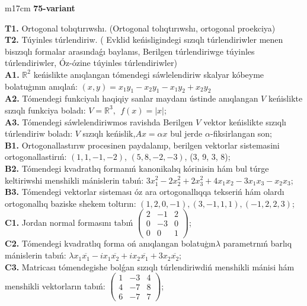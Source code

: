 \documentclass{article}
\begin{document}
\vspace{1cm}


\begin{tabular}{m{17cm}}
\textbf{75-variant}
\newline

\textbf{T1.} Ortogonal  tolıqtırıwshı. (Ortogonal tolıqtırıwshı,  ortogonal proekciya) \\
\textbf{T2.} Túyinles túrlendiriw. ( Evklid keńisligindegi sızıqlı túrlendiriwler menen bisızıqlı formalar arasındaǵı baylanıs, Berilgen túrlendiriwge túyinles túrlendiriwler, Óz-ózine túyinles túrlendiriwler) \\
\textbf{A1.} \(\mathbb{R}^{2}\) keńislikte anıqlangan tómendegi sáwlelendiriw skalyar kóbeyme bolatuģının anıqlań: \((x,y) = x_{1}y_{1} - x_{2}y_{1} - x_{1}y_{2} + x_{2}y_{2}\) \\
\textbf{A2.} Tómendegi funkciyalı haqiqiy sanlar maydanı ústinde anıqlangan \(V\) keńislikte sızıqlı funkciya boladı: \(V = \mathbb{R}^{3},\ \ f(x) = |x|\); \\
\textbf{A3.} Tómendegi sáwlelendiriwmos ravishda Berilgen \(V\) vektor keńislikte sızıqlı túrlendiriw boladı: \(V\) sızıqlı keńislik,\(Ax = \alpha x\) bul jerde \(\alpha\)-fiksirlangan son; \\
\textbf{B1.} Ortogonallastırıw procesinen paydalanıp, berilgen vektorlar sistemasini ortogonallastirıń: \((1,1, - 1, - 2)\), \((5,8, - 2, - 3)\), (3, 9, 3, 8); \\
\textbf{B2.} Tómendegi kvadratlıq formanıń kanonikalıq kórinisin hám bul túrge keltiriwshi menshikli mánislerin tabıń: \(3x_{1}^{2} - 2x_{2}^{2} + 2x_{3}^{2} + 4x_{1}x_{2} - 3x_{1}x_{3} - x_{2}x_{3}\); \\
\textbf{B3.} Tómendegi vektorlar sisteması óz ara ortogonallıqqa tekseriń hám olardı ortogonallıq baziske shekem toltırın: \((1,2,0, - 1),(3, - 1,1,1),( - 1,2,2,3)\); \\
\textbf{C1.} Jordan normal formasını tabıń \(\begin{pmatrix} 2 & - 1 & 2 \\ 0 & - 3 & 0 \\ 0 & 0 & 1 \end{pmatrix}\); \\
\textbf{C2.} Tómendegi kvadratlıq forma oń anıqlangan bolatuģın\(\lambda\) parametrnıń barlıq mánislerin tabıń: \(\lambda x_{1}\overline{x_{1}} - ix_{1}\overline{x_{2}} + ix_{2}\overline{x_{1}} + 3x_{2}\overline{x_{2}}\); \\
\textbf{C3.} Matricası tómendegishe bolǵan sızıqlı túrlendiriwdiń menshikli mánisi hám menshikli vektorların tabıń: \(\begin{pmatrix} 1 & - 3 & 4 \\ 4 & - 7 & 8 \\ 6 & - 7 & 7 \end{pmatrix}\); \\

\end{tabular}
\vspace{1cm}
\end{document}
